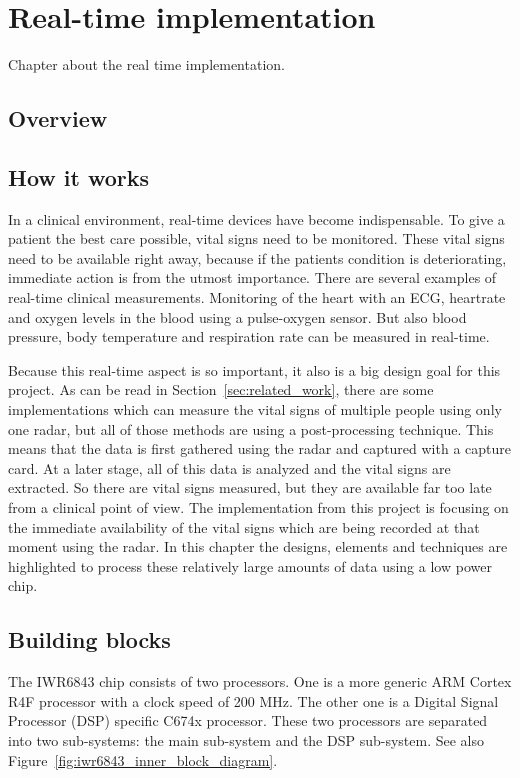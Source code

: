 \chapter{Real-time implementation}
\label{chp:realtime_implementation}

Chapter about the real time implementation.

\section{Overview}

\section{How it works}
In a clinical environment, real-time devices have become indispensable. To give a patient the best care possible, vital signs need to be monitored. These vital signs need to be available right away, because if the patients condition is deteriorating, immediate action is from the utmost importance. There are several examples of real-time clinical measurements. Monitoring of the heart with an ECG, heartrate and oxygen levels in the blood using a pulse-oxygen sensor. But also blood pressure, body temperature and respiration rate can be measured in real-time.

Because this real-time aspect is so important, it also is a big design goal for this project. As can be read in Section~\ref{sec:related_work}, there are some implementations which can measure the vital signs of multiple people using only one radar, but all of those methods are using a post-processing technique. This means that the data is first gathered using the radar and captured with a capture card. At a later stage, all of this data is analyzed and the vital signs are extracted. So there are vital signs measured, but they are available far too late from a clinical point of view. The implementation from this project is focusing on the immediate availability of the vital signs which are being recorded at that moment using the radar. In this chapter the designs, elements and techniques are highlighted to process these relatively large amounts of data using a low power chip.

\section{Building blocks}
\label{sec:building_blocks}
The IWR6843 chip consists of two processors. One is a more generic ARM Cortex R4F processor with a clock speed of 200 MHz. The other one is a Digital Signal Processor (DSP) specific C674x processor. These two processors are separated into two sub-systems: the main sub-system and the DSP sub-system. See also Figure~\ref{fig:iwr6843_inner_block_diagram}.


